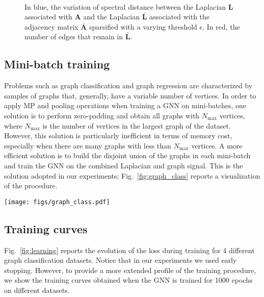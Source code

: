\documentclass[journal]{IEEEtran}
\def\A{{\mathbf A}}
\def\L{{\mathbf L}}
\begin{document}
\begin{figure}
    \centering
    ~
    ~
    \caption{In blue, the variation of spectral distance between the Laplacian $\L$ associated with $\A$ and the Laplacian $\bar{\L}$ associated with the adjacency matrix $\bar \A$ sparsified with a varying threshold $\epsilon$. In red, the number of edges that remain in $\bar{\L}$.}
    \label{fig:varying_eps2}
\end{figure}
	

\subsection{Mini-batch training}
Problems such as graph classification and graph regression are characterized by samples of graphs that, generally, have a variable number of vertices.
In order to apply MP and pooling operations when training a GNN on mini-batches, one solution is to perform zero-padding and obtain all graphs with $N_\text{max}$ vertices, where $N_\text{max}$ is the number of vertices in the largest graph of the dataset.
However, this solution is particularly inefficient in terms of memory cost, especially when there are many graphs with less than $N_\text{max}$ vertices.
A more efficient solution is to build the disjoint union of the graphs in each mini-batch and train the GNN on the combined Laplacian and graph signal.
This is the solution adopted in our experiments; Fig.~\ref{fig:graph_class} reports a visualization of the procedure.

\begin{figure*}[!ht]
    \centering
    \texttt{[image: figs/graph\_class.pdf]}    
    \caption{Example of the implementation used in the graph classification task, where the GNN is fed with a disjoint union of the graphs in mini-batch. The illustration shows an example for a mini-batch of size three.}
    \label{fig:graph_class}
\end{figure*}

\subsection{Training curves}
Fig.~\ref{fig:learning} reports the evolution of the loss during training for 4 different graph classification datasets.
Notice that in our experiments we used early stopping. 
However, to provide a more extended profile of the training procedure, we show the training curves obtained when the GNN is trained for 1000 epochs on different datasets.
\end{document}
